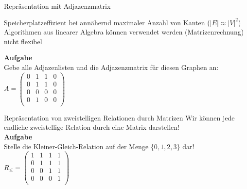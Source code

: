 \begin{frame}{Repräsentation mit Adjazenzmatrix}
	\begin{itemize}
		\pitem[\textbf{+}] Speicherplatzeffizient bei annähernd maximaler Anzahl von Kanten ($|E| \approx |V|^2$)
		\pitem[+] Algorithmen aus linearer Algebra können verwendet werden (Matrizenrechnung)
		\pitem[\textbf{--}] nicht flexibel
	\end{itemize}
\end{frame}

\begin{frame}
	\textbf{Aufgabe}\\
	Gebe alle Adjazenlisten und die Adjazenzmatrix für diesen Graphen an:
	\pause
	$ A =
	\begin{pmatrix}
	0&1&1&0\\
	0&1&1&0\\
	0&0&0&0\\
	0&1&0&0\\
	\end{pmatrix}	
	$
\end{frame}

\begin{frame}{Repräsentation von zweistelligen Relationen durch Matrizen}
	Wir können jede endliche zweistellige Relation durch eine Matrix darstellen!\\
	\textbf{Aufgabe}\\
	Stelle die Kleiner-Gleich-Relation auf der Menge $\{0, 1, 2, 3\}$ dar!\\
	\pause
	$ R_{\leq} =
	\begin{pmatrix}
	1&1&1&1\\
	0&1&1&1\\
	0&0&1&1\\
	0&0&0&1\\
	\end{pmatrix}	
	$
\end{frame}

